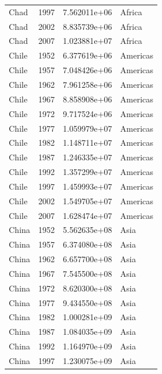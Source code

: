 \documentclass[
  letterpaper,
  DIV=11,
  numbers=noendperiod]{scrreprt}
\begin{document}
\begin{tcolorbox}
\begin{tabular}{lrrl}
Chad                     &  1997 &  7.562011e+06 &    Africa \\
Chad                     &  2002 &  8.835739e+06 &    Africa \\
Chad                     &  2007 &  1.023881e+07 &    Africa \\
Chile                    &  1952 &  6.377619e+06 &  Americas \\
Chile                    &  1957 &  7.048426e+06 &  Americas \\
Chile                    &  1962 &  7.961258e+06 &  Americas \\
Chile                    &  1967 &  8.858908e+06 &  Americas \\
Chile                    &  1972 &  9.717524e+06 &  Americas \\
Chile                    &  1977 &  1.059979e+07 &  Americas \\
Chile                    &  1982 &  1.148711e+07 &  Americas \\
Chile                    &  1987 &  1.246335e+07 &  Americas \\
Chile                    &  1992 &  1.357299e+07 &  Americas \\
Chile                    &  1997 &  1.459993e+07 &  Americas \\
Chile                    &  2002 &  1.549705e+07 &  Americas \\
Chile                    &  2007 &  1.628474e+07 &  Americas \\
China                    &  1952 &  5.562635e+08 &      Asia \\
China                    &  1957 &  6.374080e+08 &      Asia \\
China                    &  1962 &  6.657700e+08 &      Asia \\
China                    &  1967 &  7.545500e+08 &      Asia \\
China                    &  1972 &  8.620300e+08 &      Asia \\
China                    &  1977 &  9.434550e+08 &      Asia \\
China                    &  1982 &  1.000281e+09 &      Asia \\
China                    &  1987 &  1.084035e+09 &      Asia \\
China                    &  1992 &  1.164970e+09 &      Asia \\
China                    &  1997 &  1.230075e+09 &      Asia \\

\end{tabular}
\end{tcolorbox}
\end{document}
